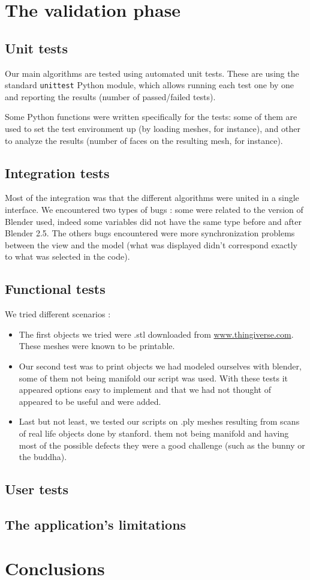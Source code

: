 \documentclass{report}
\begin{document}
\chapter{The validation phase}

\section{Unit tests}
Our main algorithms are tested using automated unit tests. These are using the standard \texttt{unittest} Python module, which allows running each test one by one and reporting the results (number of passed/failed tests).

Some Python functions were written specifically for the tests: some of them are used to set the test environment up (by loading meshes, for instance), and other to analyze the results (number of faces on the resulting mesh, for instance).

\section{Integration tests}
Most of the integration was that the different algorithms were united in a single interface. We encountered two types of bugs : some were related to the version of Blender used, indeed some variables did not have the same type before and after Blender 2.5. The others bugs encountered were more synchronization problems between the view and the model (what was displayed didn't correspond exactly to what was selected in the code). 

\section{Functional tests}
We tried different scenarios :
\begin{itemize}
\item The first objects we tried were .stl downloaded from \url{www.thingiverse.com}. These meshes were known to be printable.
\item Our second test was to print objects we had modeled ourselves with blender, some of them not being manifold our script was used. With these tests it appeared options easy to implement and that we had not thought of appeared to be useful and were added.
\item Last but not least, we tested our scripts on .ply meshes resulting from scans of real life objects done by stanford. them not being manifold and having most of the possible defects they were a good challenge (such as the bunny or the buddha).  
\end{itemize}

\section{User tests}

\section{The application's limitations}

\chapter{Conclusions}





\appendix
\end{document}
